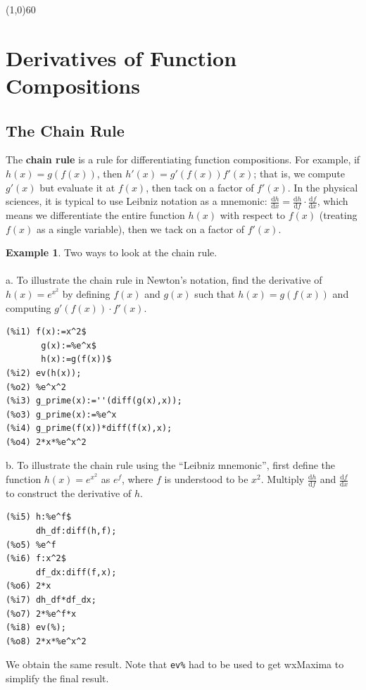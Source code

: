 \documentclass[10.5pt,twoside]{report}
\theoremstyle{definition}
\newtheorem{exmp}{Example}[section]
\begin{document}
\line(1,0){60}
\linethickness{0.5mm}
\pagebreak





\section{Derivatives of Function Compositions}\label{Derivatives of Function Compositions}

\subsection{The Chain Rule}

The \textbf{chain rule} is a rule for differentiating function compositions.  For example, if $h(x)=g(f(x))$, then $h'(x)=g'(f(x))f'(x)$; that is, we compute $g'(x)$ but evaluate it at $f(x)$, then tack on a factor of $f'(x)$.  In the physical sciences, it is typical to use Leibniz notation as a mnemonic:  $\frac{\mathrm{d} h}{\mathrm{d} x} = \frac{\mathrm{d} h}{\mathrm{d}f} \cdot \frac{\mathrm{d}f}{\mathrm{d}x}$, which means we differentiate the entire function $h(x)$ with respect to $f(x)$ (treating $f(x)$ as a single variable), then we tack on a factor of $f'(x)$.


\begin{exmp}Two ways to look at the chain rule.\\
${}$   \\
 a.  To illustrate the chain rule in Newton's notation, find the derivative of $h(x)=e^{x^2}$ by defining $f(x)$ and $g(x)$ such that $h(x)=g(f(x))$ and computing $g'(f(x))\cdot f'(x)$. \\

\begin{verbatim}
(%i1) f(x):=x^2$
       g(x):=%e^x$
       h(x):=g(f(x))$
(%i2) ev(h(x));
(%o2) %e^x^2
(%i3) g_prime(x):=''(diff(g(x),x));
(%o3) g_prime(x):=%e^x
(%i4) g_prime(f(x))*diff(f(x),x);
(%o4) 2*x*%e^x^2
\end{verbatim}


   
b.  To illustrate the chain rule using the ``Leibniz mnemonic'', first define the function $h(x)=e^{x^2}$ as $e^{f}$, where $f$ is understood to be $x^2$.  Multiply $\frac{\mathrm{d}h}{\mathrm{d}f}$ and $\frac{\mathrm{d}f}{\mathrm{d}x}$ to construct the derivative of $h$.\\


\begin{verbatim}
(%i5) h:%e^f$
      dh_df:diff(h,f);
(%o5) %e^f
(%i6) f:x^2$
      df_dx:diff(f,x);
(%o6) 2*x
(%i7) dh_df*df_dx;
(%o7) 2*%e^f*x
(%i8) ev(%);
(%o8) 2*x*%e^x^2
\end{verbatim}

We obtain the same result.  Note that \verb|ev%| had to be used to get wxMaxima to simplify the final result.


\end{exmp}
\end{document}
